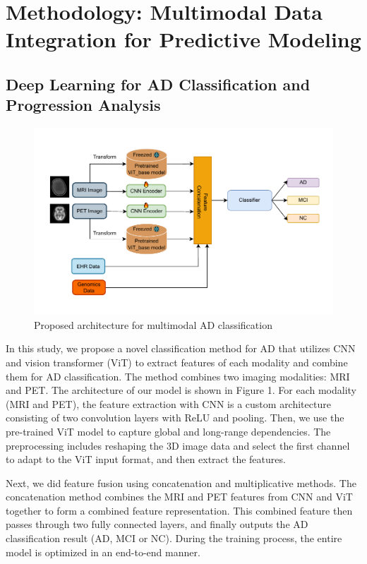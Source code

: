 \section{Methodology: Multimodal Data Integration for Predictive Modeling}
\label{sec:method}

\subsection{Deep Learning for AD Classification and Progression Analysis}
\begin{figure}
    \centering
    \includegraphics[width=1\linewidth]{figs/arch-classification_new.pdf}
    \caption{Proposed architecture for multimodal AD classification}
    \label{fig:enter-label}
\end{figure}
In this study, we propose a novel classification method for AD that utilizes CNN and vision transformer (ViT\cite{dosovitskiy_image_2021}) to extract features of each modality and combine them for AD classification. The method combines two imaging modalities: MRI and PET. The architecture of our model is shown in Figure 1. For each modality (MRI and PET), the feature extraction with CNN is a custom architecture consisting of two convolution layers with ReLU and pooling. Then, we use the pre-trained ViT model to capture global and long-range dependencies. The preprocessing includes reshaping the 3D image data and select the first channel to adapt to the ViT input format, and then extract the features. 

Next, we did feature fusion using concatenation and multiplicative methods. The concatenation method combines the MRI and PET features from CNN and ViT together to form a combined feature representation. This combined feature then passes through two fully connected layers, and finally outputs the AD classification result (AD, MCI or NC). During the training process, the entire model is optimized in an end-to-end manner. 

